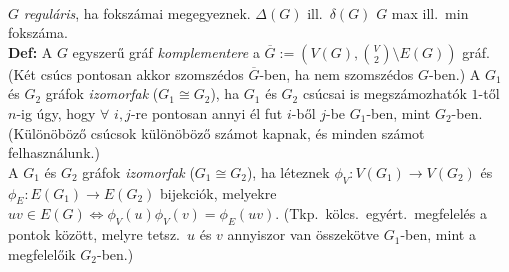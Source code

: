 \documentclass[a4paper]{article}
\newcommand{\0}{{\bf 0}}
\newcommand{\defi}{{\bf Def:} }
\begin{document}
    \\
    $G$ \emph{reguláris}, ha fokszámai megegyeznek.
    $\Delta(G)$ ill.\ $\delta(G)$ $G$ max ill.\ min fokszáma. 
     \\
    \defi A $G$ egyszerű gráf \emph{komplementere} a
    $\overline{G}:=(V(G),\binom  V2\setminus E(G))$ gráf. (Két csúcs pontosan
    akkor szomszédos $\overline G$-ben, ha nem szomszédos $G$-ben.)
    A $G_1$ és $G_2$ gráfok \emph{izomorfak} ($G_1\cong G_2$), ha $G_1$ és
    $G_2$ csúcsai is megszámozhatók $1$-től $n$-ig úgy, hogy $\forall$ $i
    ,j$-re pontosan annyi él fut $i$-ből $j$-be $G_1$-ben, mint
    $G_2$-ben. (Különöböző csúcsok különöböző számot kapnak, és minden
    számot felhasználunk.)\\
    \iffalse
    A $G_1$ és $G_2$ gráfok \emph{izomorfak} ($G_1\cong G_2$), ha léteznek
    $\phi_V:V(G_1)\to V(G_2)$ és $\phi_E:E(G_1)\to E(G_2)$ bijekciók, melyekre
    $uv\in E(G)\iff \phi_V(u)\phi_V(v)=\phi_E(uv)$. (Tkp.\ kölcs.\ egyért.\
    megfelelés a pontok között, melyre tetsz.\ $u$ és $v$ annyiszor van
    összekötve $G_1$-ben, mint a megfelelőik $G_2$-ben.)
    
\end{document}
